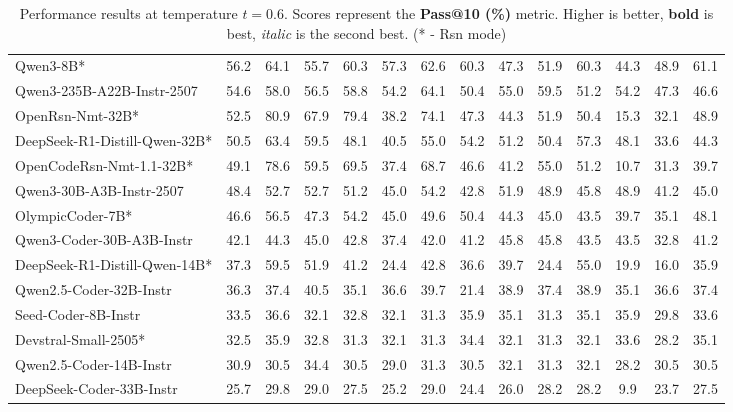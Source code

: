 \documentclass{llmxive}
\begin{document}
\begin{table}[hbt]
{\begin{tabular}{l *{13}{c}}
Qwen3-8B* & 56.2&   64.1&   55.7&   60.3&   57.3&   62.6&   60.3&   47.3&   51.9&   60.3&   44.3&   48.9&   61.1\\						
\rowcolor{gray!10}
Qwen3-235B-A22B-Instr-2507&	54.6&   58.0&   56.5&   58.8&   54.2&   64.1&   50.4&   55.0&   59.5&   51.2&   54.2&   47.3&   46.6\\											
OpenRsn-Nmt-32B* & 52.5&   80.9&   67.9&   79.4&   38.2&   74.1&   47.3&   44.3&   51.9&   50.4&   15.3&   32.1&   48.9\\											
\rowcolor{gray!10}
DeepSeek-R1-Distill-Qwen-32B* & 50.5&   63.4&   59.5&   48.1&   40.5&   55.0&   54.2&   51.2&   50.4&   57.3&   48.1&   33.6&   44.3\\											
OpenCodeRsn-Nmt-1.1-32B* & 49.1&   78.6&   59.5&   69.5&   37.4&   68.7&   46.6&   41.2&   55.0&   51.2&   10.7&   31.3&   39.7\\											
\rowcolor{gray!10}
Qwen3-30B-A3B-Instr-2507&	48.4&   52.7&   52.7&   51.2&   45.0&   54.2&   42.8&   51.9&   48.9&   45.8&   48.9&   41.2&   45.0\\											
OlympicCoder-7B* & 46.6&   56.5&   47.3&   54.2&   45.0&   49.6&   50.4&   44.3&   45.0&   43.5&   39.7&   35.1&   48.1\\											
\rowcolor{gray!10}
Qwen3-Coder-30B-A3B-Instr & 42.1&   44.3&   45.0&   42.8&   37.4&   42.0&   41.2&   45.8&   45.8&   43.5&   43.5&   32.8&   41.2\\											
DeepSeek-R1-Distill-Qwen-14B* & 37.3&   59.5&   51.9&   41.2&   24.4&   42.8&   36.6&   39.7&   24.4&   55.0&   19.9&   16.0&   35.9\\											
\rowcolor{gray!10}
Qwen2.5-Coder-32B-Instr & 36.3&   37.4&   40.5&   35.1&   36.6&   39.7&   21.4&   38.9&   37.4&   38.9&   35.1&   36.6&   37.4\\											
Seed-Coder-8B-Instr & 33.5&   36.6&   32.1&   32.8&   32.1&   31.3&   35.9&   35.1&   31.3&   35.1&   35.9&   29.8&   33.6\\											
\rowcolor{gray!10}
Devstral-Small-2505* & 32.5&   35.9&   32.8&   31.3&   32.1&   31.3&   34.4&   32.1&   31.3&   32.1&   33.6&   28.2&   35.1\\											
Qwen2.5-Coder-14B-Instr & 30.9&   30.5&   34.4&   30.5&   29.0&   31.3&   30.5&   32.1&   31.3&   32.1&   28.2&   30.5&   30.5\\											
\rowcolor{gray!10}
DeepSeek-Coder-33B-Instr & 25.7&   29.8&   29.0&   27.5&   25.2&   29.0&   24.4&   26.0&   28.2&   28.2&   9.9&   23.7&   27.5\\											

\bottomrule
\end{tabular}
}
\caption{Performance results at temperature $t=0.6$. Scores represent the \textbf{Pass@10 (\%)} metric. Higher is better, \textbf{bold} is best, \textit{italic} is the second best. (* - Rsn mode)}
\label{tab_exps_feb25_pass10_t0.6}
\end{table}
\end{document}

